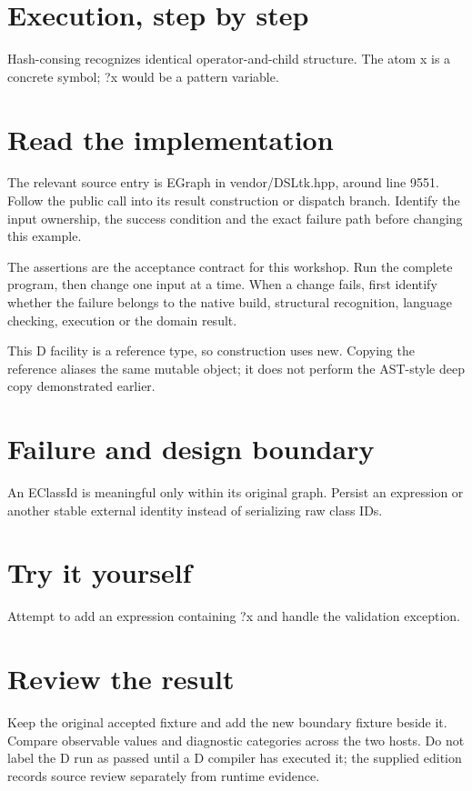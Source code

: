
\section*{Execution, step by step}
Hash-consing recognizes identical operator-and-child structure. The atom x is a concrete symbol; ?x would be a pattern variable.

\section*{Read the implementation}
The relevant source entry is EGraph in vendor/DSLtk.hpp, around line 9551. Follow the public call into its result construction or dispatch branch. Identify the input ownership, the success condition and the exact failure path before changing this example.

The assertions are the acceptance contract for this workshop. Run the complete program, then change one input at a time. When a change fails, first identify whether the failure belongs to the native build, structural recognition, language checking, execution or the domain result.

\clearpage
{}
This D facility is a reference type, so construction uses new. Copying the reference aliases the same mutable object; it does not perform the AST-style deep copy demonstrated earlier.


\section*{Failure and design boundary}
An EClassId is meaningful only within its original graph. Persist an expression or another stable external identity instead of serializing raw class IDs.

\section*{Try it yourself}
Attempt to add an expression containing ?x and handle the validation exception.

\section*{Review the result}
Keep the original accepted fixture and add the new boundary fixture beside it. Compare observable values and diagnostic categories across the two hosts. Do not label the D run as passed until a D compiler has executed it; the supplied edition records source review separately from runtime evidence.


